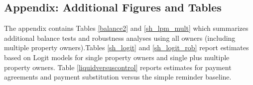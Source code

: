\documentclass[12pt]{article}
\begin{document}
\begin{appendix}

\section{Appendix: Additional Figures and Tables}

The appendix contains Tables \ref{balance2} and \ref{sh_lpm_mult}
which summarizes additional balance tests and robustness analyses
using all owners (including multiple property owners).Tables
\ref{sh_logit} and \ref{sh_logit_rob} report estimates based on Logit
models for single property owners and single plus multiple property owners. Table \ref{liquidversuscontrol} reports estimates for payment agreements and payment substitution versus the simple reminder baseline.

\setcounter{table}{0}
\renewcommand{\thetable}{A\arabic{table}}



\end{appendix}
\end{document}
